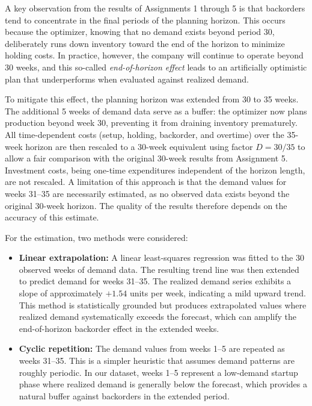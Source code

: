 \documentclass[a4paper,faculty=eb,language=en,doctype=article,sftitles=false]{ugent-doc}
\begin{document}
A key observation from the results of Assignments 1 through 5 is that backorders tend to concentrate in the final periods of the planning horizon. This occurs because the optimizer, knowing that no demand exists beyond period 30, deliberately runs down inventory toward the end of the horizon to minimize holding costs. In practice, however, the company will continue to operate beyond 30 weeks, and this so-called \textit{end-of-horizon effect} leads to an artificially optimistic plan that underperforms when evaluated against realized demand.

To mitigate this effect, the planning horizon was extended from 30 to 35 weeks. The additional 5 weeks of demand data serve as a buffer: the optimizer now plans production beyond week 30, preventing it from draining inventory prematurely. All time-dependent costs (setup, holding, backorder, and overtime) over the 35-week horizon are then rescaled to a 30-week equivalent using factor $D = 30/35$ to allow a fair comparison with the original 30-week results from Assignment 5. Investment costs, being one-time expenditures independent of the horizon length, are not rescaled. A limitation of this approach is that the demand values for weeks 31--35 are necessarily estimated, as no observed data exists beyond the original 30-week horizon. The quality of the results therefore depends on the accuracy of this estimate.

For the estimation, two methods were considered:

\begin{itemize}
    \item \textbf{Linear extrapolation:} A linear least-squares regression was fitted to the 30 observed weeks of demand data. The resulting trend line was then extended to predict demand for weeks 31--35. The realized demand series exhibits a slope of approximately $+1.54$ units per week, indicating a mild upward trend. This method is statistically grounded but produces extrapolated values where realized demand systematically exceeds the forecast, which can amplify the end-of-horizon backorder effect in the extended weeks.
    \item \textbf{Cyclic repetition:} The demand values from weeks 1--5 are repeated as weeks 31--35. This is a simpler heuristic that assumes demand patterns are roughly periodic. In our dataset, weeks 1--5 represent a low-demand startup phase where realized demand is generally below the forecast, which provides a natural buffer against backorders in the extended period.
\end{itemize}
\end{document}
